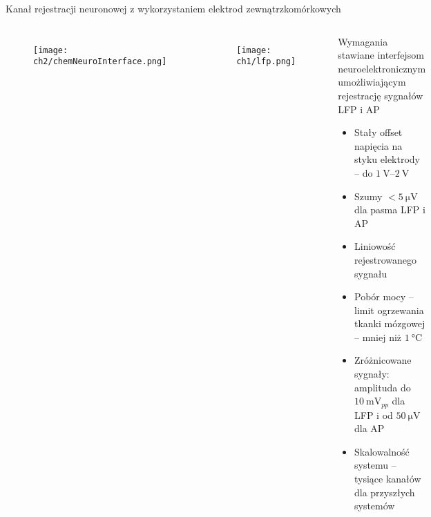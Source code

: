 \begin{frame}{Kanał rejestracji neuronowej z wykorzystaniem elektrod zewnątrzkomórkowych}
\vspace{-1em}
    \begin{columns}
        \begin{figure}[H]
            \centering
            \texttt{[image: ch2/chemNeuroInterface.png]} 

        \end{figure}
        \begin{figure}[H]
            \centering
            \texttt{[image: ch1/lfp.png]} 

          \end{figure}

        \begin{block}{Wymagania stawiane interfejsom neuroelektronicznym umożliwiającym rejestrację sygnałów LFP i AP}
            \begin{itemize}
                \item Stały offset napięcia na styku elektrody -- do $\SIrange{1}{2}{\volt}$ 
                \item Szumy $<\SI{5}{\micro\volt}$ dla pasma LFP i AP
                \item Liniowość rejestrowanego sygnału
                \item Pobór mocy -- limit ogrzewania tkanki mózgowej --  mniej niż  $\SI{1}{\degreeCelsius}$ 
                \item Zróżnicowane sygnały: amplituda do $\SI{10}{\milli\volt_{pp}}$ dla LFP i od  $\SI{50}{\micro\volt}$ dla AP
                \item Skalowalność systemu -- tysiące kanałów dla przyszłych systemów
            \end{itemize}
        \end{block}
 
    \end{columns}
\end{frame}



